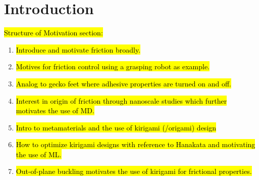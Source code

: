 \chapter{Introduction}

\hl{Structure of Motivation section:}
\begin{enumerate}
    \item \hl{Introduce and motivate friction broadly.}
    \item \hl{Motives for friction control using a grasping robot as example.}
    \item \hl{Analog to gecko feet where adhesive properties are turned on and off.}
    \item \hl{Interest in origin of friction through nanoscale studies which further motivates the use of MD.}
    \item \hl{Intro to metamaterials and the use of kirigami (/origami) design}
    \item \hl{How to optimize kirigami designs with reference to Hanakata and motivating the use of ML.}
    \item \hl{Out-of-plane buckling motivates the use of kirigami for frictional properties.}
\end{enumerate}

